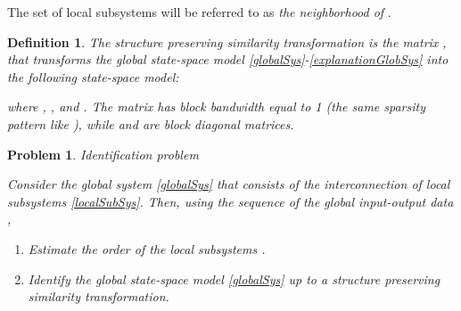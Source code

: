 \documentclass[journal,10pt]{IEEEtran}
\newtheorem{definition}[thm]{Definition}
\newtheorem{problem}[thm]{Problem}
\begin{document}
\par
 The set of local subsystems  will be referred to as \textit{the neighborhood of }. \\
\begin{definition}
\label{structurePreservingSimDef}
\textit{The structure preserving similarity transformation} is the matrix , that transforms the global state-space model \eqref{globalSys}-\eqref{explanationGlobSys} into the following state-space model:
\begin{small}

\end{small}
where , ,  and . The matrix  has block bandwidth equal to 1 (the same sparsity pattern like ), while  and  are block diagonal matrices.\\
\end{definition} 
\begin{problem} \textit{Identification problem} 
\par
Consider the global system \eqref{globalSys} that consists of the interconnection of  local subsystems \eqref{localSubSys}. Then, using the sequence of the global input-output data ,
\begin{enumerate}
\item Estimate the order of the local subsystems .
\item Identify the global state-space model \eqref{globalSys} up to a structure preserving similarity transformation.
\end{enumerate} 
\label{identificationProblem}
\end{problem}
\end{document}

